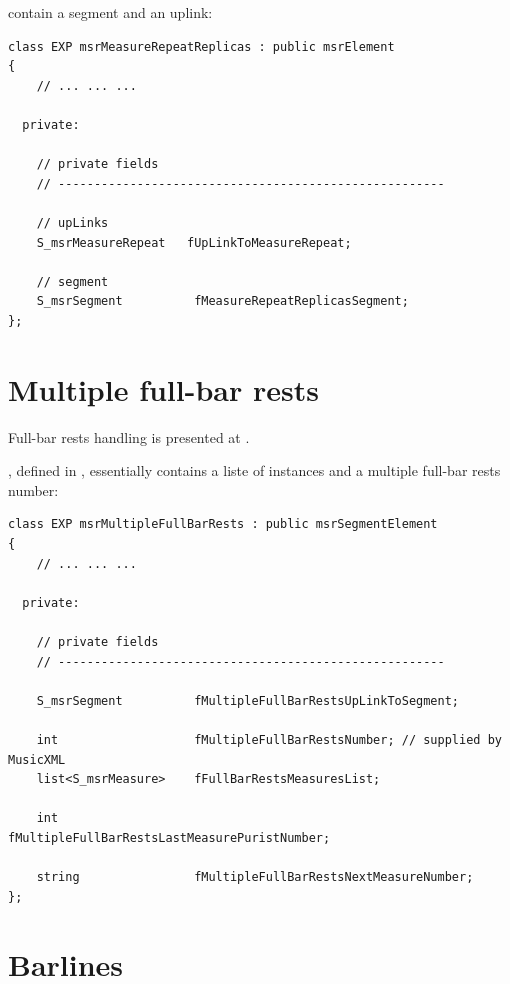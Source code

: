  contain a segment and an uplink:
\begin{lstlisting}[language=CPlusPlus]
class EXP msrMeasureRepeatReplicas : public msrElement
{
	// ... ... ...

  private:

    // private fields
    // ------------------------------------------------------

    // upLinks
    S_msrMeasureRepeat   fUpLinkToMeasureRepeat;

    // segment
    S_msrSegment          fMeasureRepeatReplicasSegment;
};
\end{lstlisting}


\section{Multiple full-bar rests}\label{Multiple full-bar rests}

Full-bar rests handling is presented at .

, defined in , essentially contains a liste of  instances and a multiple full-bar rests number:
\begin{lstlisting}[language=CPlusPlus]
class EXP msrMultipleFullBarRests : public msrSegmentElement
{
	// ... ... ...

  private:

    // private fields
    // ------------------------------------------------------

    S_msrSegment          fMultipleFullBarRestsUpLinkToSegment;

    int                   fMultipleFullBarRestsNumber; // supplied by MusicXML
    list<S_msrMeasure>    fFullBarRestsMeasuresList;

    int                   fMultipleFullBarRestsLastMeasurePuristNumber;

    string                fMultipleFullBarRestsNextMeasureNumber;
};
\end{lstlisting}


\section{Barlines}\label{Barlines}


